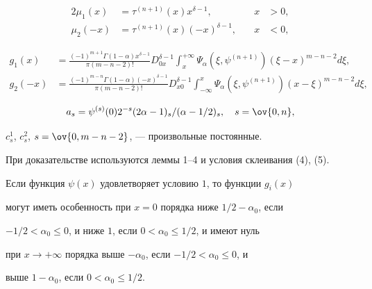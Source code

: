 \begin{thm}
\begin{alignat}{2}
\mu_1(x)&=\tau^{(n+1)}(x)x^{\delta-1},&\quad x&>0,\\ 


\mu_2(-x)&=\tau^{(n+1)}(x)(-x)^{\delta-1},&\quad x&<0, 


\end{alignat} 


% 


\begin{align*} 


g_1(x)&=\frac{(-1)^{m+1}\Gamma(1-\alpha)x^{\delta-1}} 


{\pi(m-n-2)!}D^{\delta-1}_{0x}\int^{+\infty}_x 


\Psi_\alpha(\xi,\psi^{(n+1)})(\xi-x)^{m-n-2}d\xi,\\ 


% 


g_2(-x)&=\frac{(-1)^{m-n}\Gamma(1-\alpha)(-x)^{\delta-1}} 


{\pi(m-n-2)!}D^{\delta-1}_{x0}\int_{-\infty}^x 


\Psi_\alpha(\xi,\psi^{(n+1)})(x-\xi)^{m-n-2}d\xi,


\end{align*} 


$$ 


a_s=\psi^{(s)}(0)2^{-s}(2\alpha-1)_s/(\alpha-1/2)_s,\quad 


s=\ov{0,n}, 


$$ 


$c^1_s$, $c^2_s$, $s=\ov{0,m-n-2}$, --- произвольные постоянные. 


\end{thm} 


 


При доказательстве используются леммы 1--4 и условия склеивания (4), (5). 


 


 


\begin{lem} 


Если функция $\psi(x)$ удовлетворяет условию $1$, то функции $g_i(x)$ 


могут иметь особенность при $x=0$ порядка ниже $1/2-\alpha_0$, если 


$-1/2<\alpha_0\le0$, и ниже $1$, если $0<\alpha_0\le1/2$, и имеют нуль 


при $x\to+\infty$ порядка выше $-\alpha_0$, если $-1/2<\alpha_0\le0$, и 


выше $1-\alpha_0$, если $0<\alpha_0\le1/2$. 


\end{lem} 


